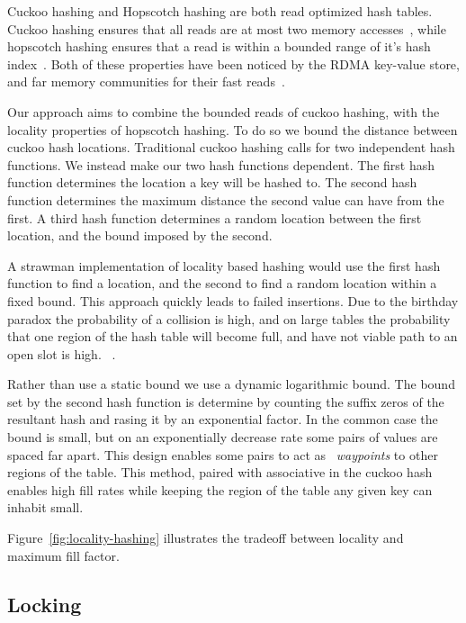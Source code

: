 Cuckoo hashing and Hopscotch hashing are both read optimized
hash tables. Cuckoo hashing ensures that all reads are at
most two memory accesses~\cite{cuckoo}, while hopscotch
hashing ensures that a read is within a bounded range of
it's hash index~\cite{hopscotch}. Both of these properties
have been noticed by the RDMA key-value store, and far
memory communities for their fast
reads~\cite{memc3,cuckoo-improvements,pilaf,farm}.

Our approach aims to combine the bounded reads of cuckoo
hashing, with the locality properties of hopscotch hashing.
To do so we bound the distance between cuckoo hash
locations. Traditional cuckoo hashing calls for two
independent hash functions. We instead make our two hash
functions dependent. The first hash function determines the
location a key will be hashed to. The second hash function
determines the maximum distance the second value can have
from the first. A third hash function determines a random
location between the first location, and the bound imposed by
the second.

A strawman implementation of locality based hashing would
use the first hash function to find a location, and the
second to find a random location within a fixed bound. This
approach quickly leads to failed insertions. Due to the
birthday paradox the probability of a collision is high, and
on large tables the probability that one region of the hash
table will become full, and have not viable path to an open
slot is high. ~.

Rather than use a static bound we use a dynamic logarithmic
bound. The bound set by the second hash function is
determine by counting the suffix zeros of the resultant hash
and rasing it by an exponential factor. In the common case
the bound is small, but on an exponentially decrease rate
some pairs of values are spaced far apart. This design
enables some pairs to act as ~\textit{waypoints} to other
regions of the table. This method, paired with associative
in the cuckoo hash enables high fill rates while keeping the
region of the table any given key can inhabit
small.

Figure~\ref{fig:locality-hashing} illustrates the tradeoff
between locality and maximum fill factor. 

\subsection{Locking}

